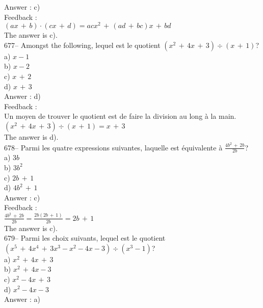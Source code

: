 \documentclass[letterpaper, 12pt]{article}
\begin{document}
Answer : c)\\

Feedback : \\
$\left( ax\,+\,b\right) \cdot\left( cx\,+\,d\right) =acx^2\,+\,\left(
ad\,+\,bc\right)x \,+\,bd$\\
The answer is c).\\

677-- Amongst the following, lequel est le quotient $\left(
x^{2}\,+\,4x\,+\,3\right) \div \left( x\,+\,1\right)$?\\
a) $x-1$\\
b) $x-2$ \\
c) $x\,+\,2$\\
d) $x\,+\,3$\\

Answer : d)\\

Feedback : \\
Un moyen de trouver le quotient est de faire la division au long \`a la
main.\\
$\left( x^{2}\,+\,4x\,+\,3\right) \div \left( x\,+\,1\right)= x\,+\,3$\\
The answer is d).\\

678-- Parmi les quatre expressions suivantes, laquelle est \'equivalente \`a
$\frac{4b^{2}\,+\,2b}{2b}$?\\
a) $3b$\\
b) $3b^{2}$\\
c) $2b\,+\,1$\\
d) $4b^{2}\,+\,1$\\

Answer : c)\\

Feedback : \\[2mm]
$\frac{4b^{2}\,+\,2b}{2b}=\frac{2b\left(2b\,+\,1 \right)
}{2b}=2b\,+\,1$\\[2mm]
The answer is c).\\

679-- Parmi les choix suivants, lequel est le quotient $\left(
x^{5}\,+\,4x^{4}\,+\,3x^{3}-x^{2}-4x-3\right) \div\left( x^{3}-1\right) $?\\
a) $x^{2}\,+\,4x\,+\,3$\\
b) $x^{2}\,+\,4x-3$\\
c) $x^{2}-4x\,+\,3$\\
d) $x^{2}-4x-3$\\

Answer : a)\\
\end{document}
